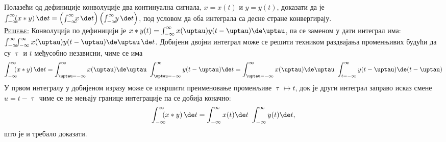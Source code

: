\PID 
Полазећи од дефиниције 
конволуције два континуална сигнала, $x = x(t)$ и 
$y = y(t)$, доказати да је 
$\int_{-\infty}^{\infty} \hspace*{-0.5em} 
(x \ast y) \, \de t = 
\left( \int_{-\infty}^{\infty} \hspace*{-0.5em}
x \, \de  t \right)
\left( \int_{-\infty}^{\infty} \hspace*{-0.5em}
 y \, \de t \right)$, 
 под условом да оба интеграла
 са десне стране конвергирају.
\\[2mm]

\textsc{\underline{Решење:}} Конволуција по дефиницији је 
$x\ast y (t)  = \int_{-\infty}^{\infty} x(\uptau) y(t-\uptau) \de \uptau$, па 
се заменом у дати интеграл има:
$
    \int_{-\infty}^{\infty} \hspace*{-0.5em} 
    \int_{-\infty}^{\infty} x(\uptau) y(t-\uptau) \de \uptau \, \de t
$. Добијени двојни интеграл може се решити техником раздвајања променњивих 
будући да су $\uptau$ и $t$ међусобно независни, чиме се има 
\begin{equation}
    \int_{-\infty}^{\infty} \hspace*{-0.5em} 
    (x \ast y) \, \de t = 
    \int_{\uptau = -\infty}^{\infty} x(\uptau)  \de \uptau \ 
    \int_{\uptau = -\infty}^{\infty} y(t-\uptau) \de t 
    = 
    \int_{\uptau = -\infty}^{\infty} x(\uptau)  \de \uptau \ 
    \int_{t = -\infty}^{\infty} y(t-\uptau) \de ({t - \uptau})
\end{equation}
У првом интегралу у добијеном изразу може се извршити преименовање променљиве $\uptau \mapsto t$, док је други интеграл 
заправо исказ смене $u = t - \uptau$ чиме се не мењају границе интеграције па се добија коначно: 
\begin{equation}
    \int_{-\infty}^{\infty} \hspace*{-0.5em} 
    (x \ast y) \, \de t = 
    \int_{-\infty}^{\infty} x(t)  \de t \ 
    \int_{-\infty}^{\infty} y(t) \de t,
\end{equation}
што је и требало доказати.